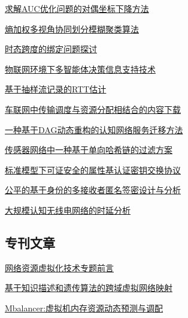 \documentclass[a4paper]{article}
\begin{document}
\href{http://www.jos.org.cn/ch/reader/download_pdf.aspx?file_no=4504&year_id=2014&quarter_id=10&falg=1}{求解AUC优化问题的对偶坐标下降方法}

\href{http://www.jos.org.cn/ch/reader/download_pdf.aspx?file_no=4510&year_id=2014&quarter_id=10&falg=1}{熵加权多视角协同划分模糊聚类算法}

\href{http://www.jos.org.cn/ch/reader/download_pdf.aspx?file_no=4563&year_id=2014&quarter_id=10&falg=1}{时态跨度的绑定问题探讨}

\href{http://www.jos.org.cn/ch/reader/download_pdf.aspx?file_no=4582&year_id=2014&quarter_id=10&falg=1}{物联网环境下多智能体决策信息支持技术}

\href{http://www.jos.org.cn/ch/reader/download_pdf.aspx?file_no=4461&year_id=2014&quarter_id=10&falg=1}{基于抽样流记录的RTT估计}

\href{http://www.jos.org.cn/ch/reader/download_pdf.aspx?file_no=4499&year_id=2014&quarter_id=10&falg=1}{车联网中传输调度与资源分配相结合的内容下载}

\href{http://www.jos.org.cn/ch/reader/download_pdf.aspx?file_no=4501&year_id=2014&quarter_id=10&falg=1}{一种基于DAG动态重构的认知网络服务迁移方法}

\href{http://www.jos.org.cn/ch/reader/download_pdf.aspx?file_no=4495&year_id=2014&quarter_id=10&falg=1}{传感器网络中一种基于单向哈希链的过滤方案}

\href{http://www.jos.org.cn/ch/reader/download_pdf.aspx?file_no=4505&year_id=2014&quarter_id=10&falg=1}{标准模型下可证安全的属性基认证密钥交换协议}

\href{http://www.jos.org.cn/ch/reader/download_pdf.aspx?file_no=4506&year_id=2014&quarter_id=10&falg=1}{公平的基于身份的多接收者匿名签密设计与分析}

\href{http://www.jos.org.cn/ch/reader/download_pdf.aspx?file_no=4577&year_id=2014&quarter_id=10&falg=1}{大规模认知无线电网络的时延分析}

\subsection{专刊文章}
\href{http://www.jos.org.cn/ch/reader/download_pdf.aspx?file_no=4683&year_id=2014&quarter_id=10&falg=1}{网络资源虚拟化技术专题前言}

\href{http://www.jos.org.cn/ch/reader/download_pdf.aspx?file_no=4680&year_id=2014&quarter_id=10&falg=1}{基于知识描述和遗传算法的跨域虚拟网络映射}

\href{http://www.jos.org.cn/ch/reader/download_pdf.aspx?file_no=4681&year_id=2014&quarter_id=10&falg=1}{Mbalancer:虚拟机内存资源动态预测与调配}
\end{document}
